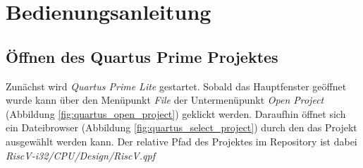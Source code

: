\chapter{Bedienungsanleitung}

    \section{Öffnen des Quartus Prime Projektes}
        Zunächst wird \textit{Quartus Prime Lite} gestartet.
        Sobald das Hauptfenster geöffnet wurde kann über den Menüpunkt \textit{File}
        der Untermenüpunkt \textit{Open Project} (Abbildung \ref{fig:quartus_open_project})
        geklickt werden. Daraufhin öffnet sich ein Dateibrowser (Abbildung \ref{fig:quartus_select_project})
        durch den das Projekt ausgewählt werden kann.
        Der relative Pfad des Projektes im Repository ist dabei \textit{RiscV-i32/CPU/Design/RiscV.qpf}
        
